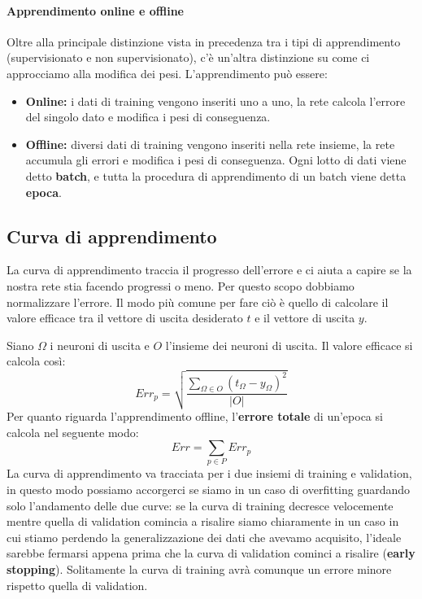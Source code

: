 \documentclass[12pt, twoside, letterpaper]{report}
\begin{document}
			\paragraph{Apprendimento online e offline} Oltre alla principale distinzione vista in precedenza tra i tipi di apprendimento (supervisionato e non supervisionato), c'è un'altra distinzione su come ci approcciamo alla modifica dei pesi. L'apprendimento può essere: 
				\begin{itemize}
					\item \textbf{Online:} i dati di training vengono inseriti uno a uno, la rete calcola l'errore del singolo dato e modifica i pesi di conseguenza.
					\item \textbf{Offline:} diversi dati di training vengono inseriti nella rete insieme, la rete accumula gli errori e modifica i pesi di conseguenza. Ogni lotto di dati viene detto \textbf{batch}, e tutta la procedura di apprendimento di un batch viene detta \textbf{epoca}.
				\end{itemize}
				
			\subsection{Curva di apprendimento}
				La curva di apprendimento traccia il progresso dell'errore e ci aiuta a capire se la nostra rete stia facendo progressi o meno. Per questo scopo dobbiamo normalizzare l'errore. Il modo più comune per fare ciò è quello di calcolare il valore efficace tra il vettore di uscita desiderato $t$ e il vettore di uscita $y$.  %

				Siano $\Omega$ i neuroni di uscita e $O$ l'insieme dei neuroni di uscita. Il valore efficace si calcola così: $$Err_p = \sqrt{\frac{\sum_{\Omega \in O} (t_{\Omega} - y_{\Omega})^2}{|O|}}$$
				Per quanto riguarda l'apprendimento offline, l'\textbf{errore totale} di un'epoca si calcola nel seguente modo: $$Err = \sum_{p \in P} Err_p$$ %
				La curva di apprendimento va tracciata per i due insiemi di training e validation, in questo modo possiamo accorgerci se siamo in un caso di overfitting guardando solo l'andamento delle due curve: se la curva di training decresce velocemente mentre quella di validation comincia a risalire siamo chiaramente in un caso in cui stiamo perdendo la generalizzazione dei dati che avevamo acquisito, l'ideale sarebbe fermarsi appena prima che la curva di validation cominci a risalire (\textbf{early stopping}). Solitamente la curva di training avrà comunque un errore minore rispetto quella di validation.
\end{document}
